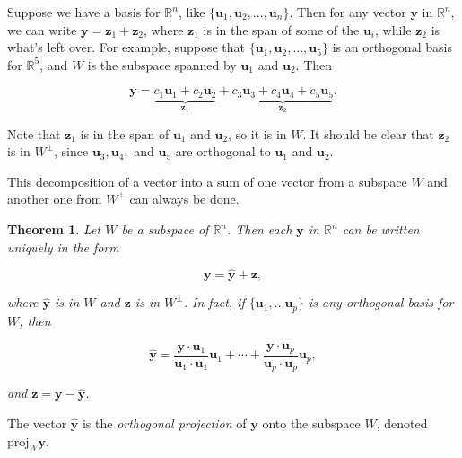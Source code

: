 \documentclass[
]{book}
\newtheorem{theorem}{Theorem}[chapter]
\theoremstyle{definition}
\theoremstyle{definition}
\theoremstyle{definition}
\theoremstyle{definition}
\theoremstyle{remark}
\begin{document}
Suppose we have a basis for \(\mathbb{R}^n\), like \(\{\mathbf{u}_1,\mathbf{u}_2,\dots,\mathbf{u}_n\}\). Then for any vector \(\mathbf{y}\) in \(\mathbb{R}^n\), we can write \(\mathbf{y}=\mathbf{z}_1+\mathbf{z}_2\), where \(\mathbf{z}_1\) is in the span of some of the \(\mathbf{u}_i\), while \(\mathbf{z}_2\) is what's left over. For example, suppose that \(\{\mathbf{u}_1,\mathbf{u}_2,\dots,\mathbf{u}_5\}\) is an orthogonal basis for \(\mathbb{R}^5\), and \(W\) is the subspace spanned by \(\mathbf{u}_1\) and \(\mathbf{u}_2\). Then

\[\mathbf{y}=\underbrace{c_1\mathbf{u}_1+c_2\mathbf{u}_2}_{\mathbf{z}_1}+\underbrace{c_3\mathbf{u}_3+c_4\mathbf{u}_4+c_5\mathbf{u}_5}_{\mathbf{z}_2}.\]

Note that \(\mathbf{z}_1\) is in the span of \(\mathbf{u}_1\) and \(\mathbf{u}_2\), so it is in \(W\). It should be clear that \(\mathbf{z}_2\) is in \(W^\perp\), since \(\mathbf{u}_3,\mathbf{u}_4,\) and \(\mathbf{u}_5\) are orthogonal to \(\mathbf{u}_1\) and \(\mathbf{u}_2\).

This decomposition of a vector into a sum of one vector from a subspace \(W\) and another one from \(W^\perp\) can always be done.

\begin{theorembox}

\begin{theorem}
Let \(W\) be a subspace of \(\mathbb{R}^n\). Then each \(\mathbf{y}\) in \(\mathbb{R}^n\) can be written uniquely in the form

\[\mathbf{y}=\hat{\mathbf{y}}+\mathbf{z},\]

where \(\hat{\mathbf{y}}\) is in \(W\) and \(\mathbf{z}\) is in \(W^\perp\). In fact, if \(\{\mathbf{u}_1,\dots \mathbf{u}_p\}\) is any orthogonal basis for \(W\), then

\[\hat{\mathbf{y}}=\frac{\mathbf{y}\cdot\mathbf{u}_1}{\mathbf{u}_1\cdot \mathbf{u}_1}\mathbf{u}_1+\cdots+\frac{\mathbf{y}\cdot \mathbf{u}_p}{\mathbf{u}_p\cdot \mathbf{u}_p}\mathbf{u}_p,\]

and \(\mathbf{z}=\mathbf{y}-\hat{\mathbf{y}}\).
\end{theorem}

\end{theorembox}

The vector \(\hat{\mathbf{y}}\) is the \emph{orthogonal projection} of \(\mathbf{y}\) onto the subspace \(W\), denoted \(\text{proj}_W\mathbf{y}.\)
\end{document}
